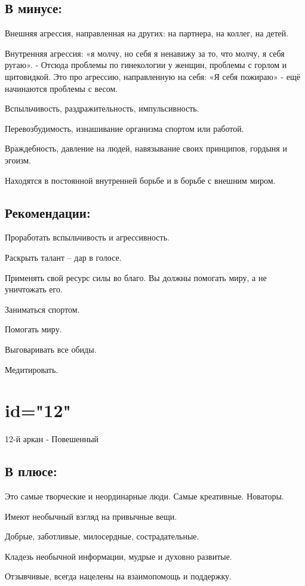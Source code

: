 \subsection{В минусе:}
\item Внешняя агрессия, направленная на других: на партнера, на коллег, на детей.
\item Внутренняя агрессия: «я молчу, но себя я ненавижу за то, что молчу, я себя ругаю». - Отсюда проблемы по гинекологии у женщин, проблемы с горлом и щитовидкой. Это про агрессию, направленную на себя: «Я себя пожираю» - ещё начинаются проблемы с весом.
\item Вспыльчивость, раздражительность, импульсивность.
\item Перевозбудимость, изнашивание организма спортом или работой.
\item Враждебность, давление на людей, навязывание своих принципов, гордыня и эгоизм.
\item Находятся в постоянной внутренней борьбе и в борьбе с внешним миром.
\endsubsection

\subsection{Рекомендации:}
\item Проработать вспыльчивость и агрессивность.
\item Раскрыть талант – дар в голосе.
\item Применять свой ресурс силы во благо. Вы должны помогать миру, а не уничтожать его.
\item Заниматься спортом.
\item Помогать миру.
\item Выговаривать все обиды.
\item Медитировать.
\endsubsection

\endsection

\section{id="12"}{12-й аркан - Повешенный}

\subsection{В плюсе:}
\item Это самые творческие и неординарные люди. Самые креативные. Новаторы.
\item Имеют необычный взгляд на привычные вещи.
\item Добрые, заботливые, милосердные, сострадательные.
\item Кладезь необычной информации, мудрые и духовно развитые. 
\item Отзывчивые, всегда нацелены на взаимопомощь и поддержку.  
\endsubsection

